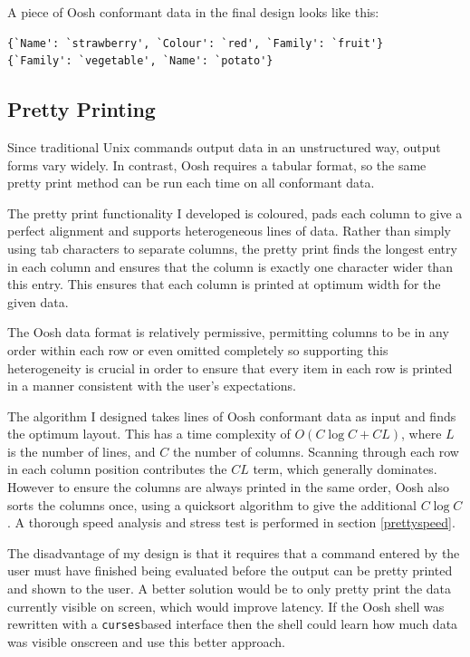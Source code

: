 \documentclass[12pt,twoside,notitlepage]{report}
\begin{document}
A piece of Oosh conformant data in the final design looks like this:

\begin{verbatim}
{`Name': `strawberry', `Colour': `red', `Family': `fruit'}
{`Family': `vegetable', `Name': `potato'}
\end{verbatim}

\subsection{Pretty Printing}
\label{prettyimpl}
Since traditional Unix commands output data in an unstructured way,
output forms vary widely. In contrast, Oosh requires a tabular format,
so the same pretty print method can be run each time on all conformant
data.

The pretty print functionality I developed is coloured, pads each
column to give a perfect alignment and supports heterogeneous lines of
data. Rather than simply using tab characters to separate columns, the
pretty print finds the longest entry in each column and ensures that
the column is exactly one character wider than this entry. This
ensures that each column is printed at optimum width for the given
data.

The Oosh data format is relatively permissive, permitting columns to
be in any order within each row or even omitted completely so
supporting this heterogeneity is crucial in order to ensure that every
item in each row is printed in a manner consistent with the user's
expectations.

The algorithm I designed takes lines of Oosh conformant data as input
and finds the optimum layout. This has a time complexity of $O(C \log
C + CL)$, where $L$ is the number of lines, and $C$ the number of
columns. Scanning through each row in each column position contributes
the $CL$ term, which generally dominates. However to ensure the
columns are always printed in the same order, Oosh also sorts the
columns once, using a quicksort algorithm to give the additional $C
\log C$. A thorough speed analysis and stress test is performed in
section \ref{prettyspeed}.

The disadvantage of my design is that it requires that a command
entered by the user must have finished being evaluated before the
output can be pretty printed and shown to the user. A better solution
would be to only pretty print the data currently visible on screen,
which would improve latency. If the Oosh shell was rewritten with a
{\tt curses}\footnotemark[1] based interface then the shell could learn how
much data was visible onscreen and use this better approach.
\end{document}
